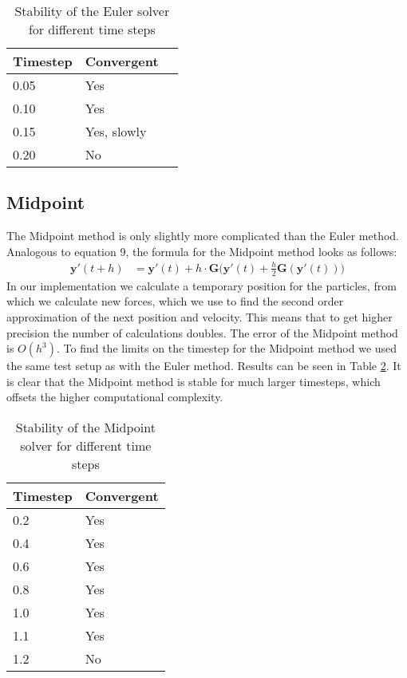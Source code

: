 \documentclass[a4paper,twoside,11pt,twocolumn]{article}
\begin{document}
\begin{table}[h]
	\caption{Stability of the Euler solver for different time steps}
	\label{Euler}
	\begin{tabular}{|l|l|l|}
		\hline
		\textbf{Timestep} & \textbf{Convergent} \\ \hline
		0.05              & Yes                 \\ \hline
		0.10              & Yes                 \\ \hline
		0.15              & Yes, slowly         \\ \hline
		0.20              & No                  \\ \hline
	\end{tabular}
\end{table}

\subsection{Midpoint}
The Midpoint method is only slightly more complicated than the Euler method. Analogous to equation 9, the formula for the Midpoint method looks as follows:
\begin{align}
	\mathbf{y}'(t+h) &= \mathbf{y}'(t) + h\cdot \mathbf{G}\biggl(\mathbf{y}'(t)+\frac{h}{2}\mathbf{G}(\mathbf{y}'(t))\biggr)
\end{align}
In our implementation we calculate a temporary position for the particles, from which we calculate new forces, which we use to find the second order approximation of the next position and velocity. This means that to get higher precision the number of calculations doubles. The error of the Midpoint method is $O(h^3)$.
To find the limits on the timestep for the Midpoint method we used the same test setup as with the Euler method. Results can be seen in Table \ref{Midpoint}. It is clear that the Midpoint method is stable for much larger timesteps, which offsets the higher computational complexity.
\begin{table}[h]
	\caption{Stability of the Midpoint solver for different time steps}
	\label{Midpoint}
	\begin{tabular}{|l|l|}
		\hline
		\textbf{Timestep} & \textbf{Convergent} \\ \hline
		0.2               & Yes                 \\ \hline
		0.4               & Yes                 \\ \hline
		0.6               & Yes                 \\ \hline
		0.8               & Yes                 \\ \hline
		1.0               & Yes                 \\ \hline
		1.1               & Yes                 \\ \hline
		1.2               & No                  \\ \hline
	\end{tabular}
\end{table}
\end{document}
